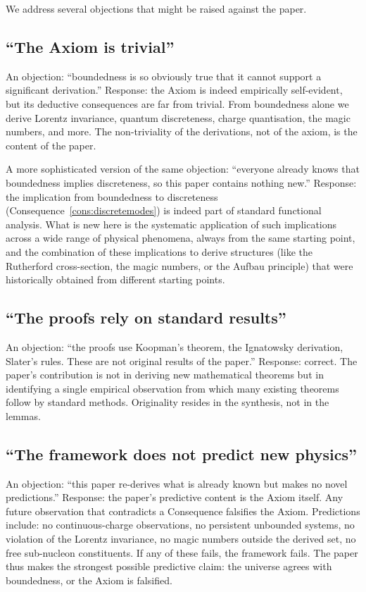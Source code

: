 \documentclass[11pt,twocolumn,a4paper]{article}
\theoremstyle{axiomstyle}
\theoremstyle{conseqstyle}
\theoremstyle{definition}
\theoremstyle{remark}
\begin{document}
We address several objections that might be raised against the paper.

\subsection{``The Axiom is trivial''}

An objection: ``boundedness is so obviously true that it cannot support a significant derivation.'' Response: the Axiom is indeed empirically self-evident, but its deductive consequences are far from trivial. From boundedness alone we derive Lorentz invariance, quantum discreteness, charge quantisation, the magic numbers, and more. The non-triviality of the derivations, not of the axiom, is the content of the paper.

A more sophisticated version of the same objection: ``everyone already knows that boundedness implies discreteness, so this paper contains nothing new.'' Response: the implication from boundedness to discreteness (Consequence~\ref{cons:discretemodes}) is indeed part of standard functional analysis. What is new here is the systematic application of such implications across a wide range of physical phenomena, always from the same starting point, and the combination of these implications to derive structures (like the Rutherford cross-section, the magic numbers, or the Aufbau principle) that were historically obtained from different starting points.

\subsection{``The proofs rely on standard results''}

An objection: ``the proofs use Koopman's theorem, the Ignatowsky derivation, Slater's rules. These are not original results of the paper.'' Response: correct. The paper's contribution is not in deriving new mathematical theorems but in identifying a single empirical observation from which many existing theorems follow by standard methods. Originality resides in the synthesis, not in the lemmas.

\subsection{``The framework does not predict new physics''}

An objection: ``this paper re-derives what is already known but makes no novel predictions.'' Response: the paper's predictive content is the Axiom itself. Any future observation that contradicts a Consequence falsifies the Axiom. Predictions include: no continuous-charge observations, no persistent unbounded systems, no violation of the Lorentz invariance, no magic numbers outside the derived set, no free sub-nucleon constituents. If any of these fails, the framework fails. The paper thus makes the strongest possible predictive claim: the universe agrees with boundedness, or the Axiom is falsified.
\end{document}
